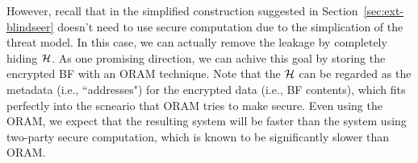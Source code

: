 However, recall that in the simplified construction suggested in
Section~\ref{sec:ext-blindseer} doesn't need to use secure computation due to
the simplication of the threat model. In this case, we can actually remove the
leakage by completely hiding ${\cal H}$. As one promising direction, we can achive
this goal by storing the encrypted BF with an ORAM technique. Note that the
${\cal H}$ can be regarded as the metadata (i.e., ``addresses") for the encrypted
data (i.e., BF contents), which fits perfectly into the scneario that ORAM
tries to make secure. 
%
Even using the ORAM, we expect that the resulting system will be faster than
the system using two-party secure computation, which is known to be
significantly slower than ORAM. 


